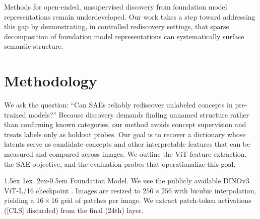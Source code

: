 \documentclass[10pt,twocolumn,letterpaper]{article}
\makeatletter
\renewcommand{\paragraph}{%
  \@startsection{paragraph}{4}%
  {\z@}{1.5ex \@plus 1ex \@minus .2ex}{-0.5em}%
  {\normalfont\normalsize\bfseries}%
}
\makeatother
\begin{document}
Methods for open-ended, unsupervised discovery from foundation model representations remain underdeveloped.
Our work takes a step toward addressing this gap by demonstrating, in controlled rediscovery settings, that sparse decomposition of foundation model representations can systematically surface semantic structure.

\section{Methodology}

We ask the question: ``Can SAEs reliably rediscover unlabeled concepts in pre-trained models?''
Because discovery demands finding unnamed structure rather than confirming known categories, our method avoids concept supervision and treats labels only as holdout probes.
Our goal is to recover a dictionary whose latents serve as candidate concepts and other interpretable features that can be measured and compared across images.
We outline the ViT feature extraction, the SAE objective, and the evaluation probes that operationalize this goal.

\paragraph{Foundation Model.} We use the publicly available DINOv3 ViT-L/16 checkpoint \citep{simeoni2025dinov3}.
Images are resized to $256\times256$ with bicubic interpolation, yielding a $16\times16$ grid of patches per image.
We extract patch-token activations ([CLS] discarded) from the final (24th) layer. 
\end{document}
